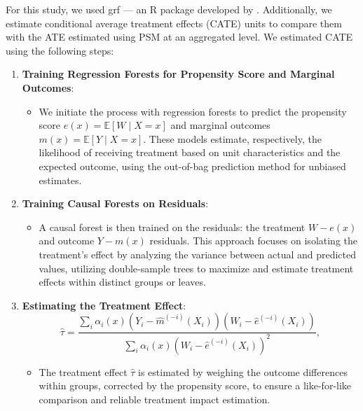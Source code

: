 \documentclass[preprint,12pt, authoryear]{elsarticle}
\begin{document}
For this study, we used grf --- an R package developed by \citet{athey_generalized_2019}.
Additionally, we estimate conditional average treatment effects (CATE) units to compare them with the ATE estimated using PSM at an aggregated level. We estimated CATE using the following steps:
\begin{enumerate}
    \item \textbf{Training Regression Forests for Propensity Score and Marginal Outcomes}:
    \begin{itemize}
        \item We initiate the process with regression forests to predict the propensity score $e(x)=\mathbb{E}\left[W \mid X=x\right]$ and marginal outcomes $m(x) = \mathbb{E}\left[Y \mid X=x\right]$. These models estimate, respectively, the likelihood of receiving treatment based on unit characteristics and the expected outcome, using the out-of-bag prediction method for unbiased estimates.
    \end{itemize}

    \item \textbf{Training Causal Forests on Residuals}:
    \begin{itemize}
        \item A causal forest is then trained on the residuals: the treatment $W - e(x)$ and outcome $Y - m(x)$ residuals. This approach focuses on isolating the treatment's effect by analyzing the variance between actual and predicted values, utilizing double-sample trees to maximize and estimate treatment effects within distinct groups or leaves.
    \end{itemize}

    \item \textbf{Estimating the Treatment Effect}:
    \begin{equation}
    \hat{\tau}=\frac{\sum_i \alpha_i(x)\left(Y_i-\hat{m}^{(-i)}\left(X_i\right)\right)\left(W_i-\hat{e}^{(-i)}\left(X_i\right)\right)}{\sum_i \alpha_i(x)\left(W_i-\hat{e}^{(-i)}\left(X_i\right)\right)^2},
    \end{equation}
    \begin{itemize}
        \item The treatment effect $\hat{\tau}$ is estimated by weighing the outcome differences within groups, corrected by the propensity score, to ensure a like-for-like comparison and reliable treatment impact estimation.
    \end{itemize}


\end{enumerate}
\end{document}
